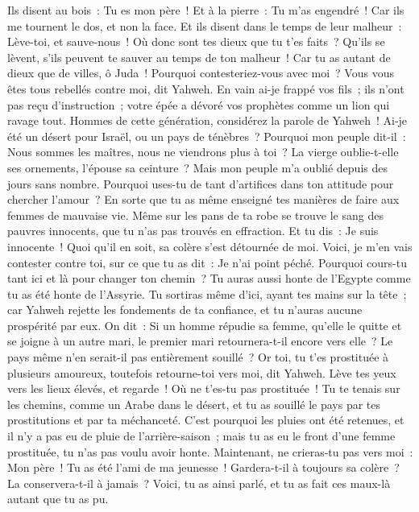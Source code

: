 \begin{multicols}{2}
Ils disent au bois~: Tu es mon père~! Et à la pierre~: Tu m'as engendré~! Car ils me tournent le dos, et non la face. Et ils disent dans le temps de leur malheur~: Lève-toi, et sauve-nous~!
Où donc sont tes dieux que tu t'es faits~? Qu'ils se lèvent, s'ils peuvent te sauver au temps de ton malheur~! Car tu as autant de dieux que de villes, ô Juda~!
Pourquoi contesteriez-vous avec moi~? Vous vous êtes tous rebellés contre moi, dit Yahweh.
En vain ai-je frappé vos fils~; ils n'ont pas reçu d'instruction~; votre épée a dévoré vos prophètes comme un lion qui ravage tout.
Hommes de cette génération, considérez la parole de Yahweh~! Ai-je été un désert pour Israël, ou un pays de ténèbres~? Pourquoi mon peuple dit-il~: Nous sommes les maîtres, nous ne viendrons plus à toi~?
La vierge oublie-t-elle ses ornements, l'épouse sa ceinture~? Mais mon peuple m'a oublié depuis des jours sans nombre.
Pourquoi uses-tu de tant d'artifices dans ton attitude pour chercher l'amour~? En sorte que tu as même enseigné tes manières de faire aux femmes de mauvaise vie.
Même sur les pans de ta robe se trouve le sang des pauvres innocents, que tu n'as pas trouvés en effraction.
Et tu dis~: Je suis innocente~! Quoi qu'il en soit, sa colère s'est détournée de moi. Voici, je m'en vais contester contre toi, sur ce que tu as dit~: Je n'ai point péché.
Pourquoi cours-tu tant ici et là pour changer ton chemin~? Tu auras aussi honte de l'Egypte comme tu as été honte de l'Assyrie.
Tu sortiras même d'ici, ayant tes mains sur la tête~; car Yahweh rejette les fondements de ta confiance, et tu n'auras aucune prospérité par eux.
\VerseOne{}On dit~: Si un homme répudie sa femme, qu'elle le quitte et se joigne à un autre mari, le premier mari retournera-t-il encore vers elle~? Le pays même n'en serait-il pas entièrement souillé~? Or toi, tu t'es prostituée à plusieurs amoureux, toutefois retourne-toi vers moi, dit Yahweh.
Lève tes yeux vers les lieux élevés, et regarde~! Où ne t'es-tu pas prostituée~! Tu te tenais sur les chemins, comme un Arabe dans le désert, et tu as souillé le pays par tes prostitutions et par ta méchanceté.
C'est pourquoi les pluies ont été retenues, et il n'y a pas eu de pluie de l'arrière-saison~; mais tu as eu le front d'une femme prostituée, tu n'as pas voulu avoir honte.
Maintenant, ne crieras-tu pas vers moi~: Mon père~! Tu as été l'ami de ma jeunesse~!
Gardera-t-il à toujours sa colère~? La conservera-t-il à jamais~? Voici, tu as ainsi parlé, et tu as fait ces maux-là autant que tu as pu.

\end{multicols}
